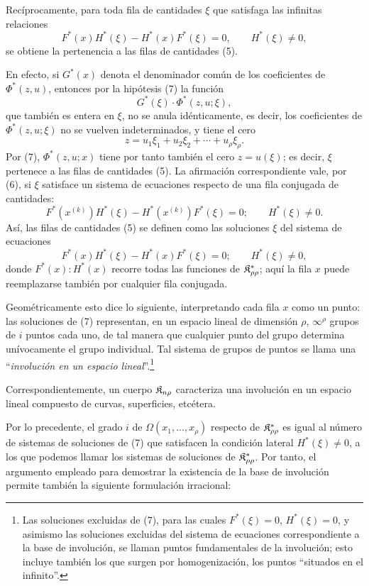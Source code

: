 \documentclass[11pt]{article}
\begin{document}
Recíprocamente, para toda fila de cantidades $\xi$ que satisfaga las infinitas relaciones
\begin{equation}
  F^*(x)H^*(\xi)-H^*(x)F^*(\xi)=0,
  \qquad H^*(\xi)\ne0,
\tag{7}
\end{equation}
se obtiene la pertenencia a las filas de cantidades (5).

En efecto, si $G^*(x)$ denota el denominador común de los coeficientes de $\Phi^*(z,u)$, entonces por la hipótesis (7) la función
\[
  G^*(\xi)\cdot\Phi^*(z,u;\xi),
\]
que también es entera en $\xi$, no se anula idénticamente, es decir, los coeficientes de $\Phi^*(z,u;\xi)$ no se vuelven indeterminados, y tiene el cero
\[
  z=u_1\xi_1+u_2\xi_2+\cdots+u_\rho\xi_\rho.
\]
Por (7), $\Phi^*(z,u;x)$ tiene por tanto también el cero $z=u(\xi)$; es decir, $\xi$ pertenece a las filas de cantidades (5). La afirmación correspondiente vale, por (6), si $\xi$ satisface un sistema de ecuaciones respecto de una fila conjugada de cantidades:
\[
  F^*(x^{(k)})H^*(\xi)-H^*(x^{(k)})F^*(\xi)=0;
  \qquad H^*(\xi)\ne0.
\]
Así, las filas de cantidades (5) se definen como las soluciones $\xi$ del sistema de ecuaciones
\[
  F^*(x)H^*(\xi)-H^*(x)F^*(\xi)=0;
  \qquad H^*(\xi)\ne0,
\]
donde $F^*(x):H^*(x)$ recorre todas las funciones de $\mathfrak{K}^*_{\rho\rho}$; aquí la fila $x$ puede reemplazarse también por cualquier fila conjugada.

Geométricamente esto dice lo siguiente, interpretando cada fila $x$ como un punto: las soluciones de (7) representan, en un espacio lineal de dimensión $\rho$, $\infty^\rho$ grupos de $i$ puntos cada uno, de tal manera que cualquier punto del grupo determina unívocamente el grupo individual. Tal sistema de grupos de puntos se llama una ``\emph{involución en un espacio lineal}''.\footnote{Las soluciones excluidas de (7), para las cuales $F^*(\xi)=0$, $H^*(\xi)=0$, y asimismo las soluciones excluidas del sistema de ecuaciones correspondiente a la base de involución, se llaman puntos fundamentales de la involución; esto incluye también los que surgen por homogenización, los puntos ``situados en el infinito''.}

Correspondientemente, un cuerpo $\mathfrak{K}_{n\rho}$ caracteriza una involución en un espacio lineal compuesto de curvas, superficies, etcétera.

Por lo precedente, el grado $i$ de $\Omega(x_1,\ldots,x_\rho)$ respecto de $\mathfrak{K}^*_{\rho\rho}$ es igual al número de sistemas de soluciones de (7) que satisfacen la condición lateral $H^*(\xi)\ne0$, a los que podemos llamar los sistemas de soluciones de $\mathfrak{K}^*_{\rho\rho}$. Por tanto, el argumento empleado para demostrar la existencia de la base de involución permite también la siguiente formulación irracional:
\end{document}
